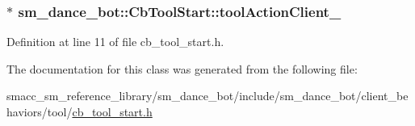\subsubsection[{\texorpdfstring{tool\+Action\+Client\+\_\+}{toolActionClient_}}]{$\ast$ sm\+\_\+dance\+\_\+bot\+::\+Cb\+Tool\+Start\+::tool\+Action\+Client\+\_\+}\hypertarget{classsm__dance__bot_1_1CbToolStart_af0d815c686d7f5cc6d16c3f8ec2443c4}{}\label{classsm__dance__bot_1_1CbToolStart_af0d815c686d7f5cc6d16c3f8ec2443c4}


Definition at line 11 of file cb\+\_\+tool\+\_\+start.\+h.



The documentation for this class was generated from the following file\+:\begin{DoxyCompactItemize}
\item 
smacc\+\_\+sm\+\_\+reference\+\_\+library/sm\+\_\+dance\+\_\+bot/include/sm\+\_\+dance\+\_\+bot/client\+\_\+behaviors/tool/\hyperlink{cb__tool__start_8h}{cb\+\_\+tool\+\_\+start.\+h}\end{DoxyCompactItemize}
